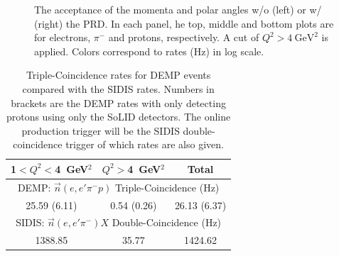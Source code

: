 \begin{figure}[!ht]
 \begin{center}
     \subfloat[w/ PRD]{
     ext=.pdf,read=.pdf,width=0.45\textwidth]{./figures/E11_acc_epi_Q2gt4}}
	 
  \caption[The acceptance of the momenta and scattering angles for electrons,
    $\pi^{-}$ and protons]{\footnotesize{The acceptance of the momenta and
    polar angles w/o (left) or w/ (right) the PRD. In each panel, he top, middle and
    bottom plots are for electrons, $\pi^{-}$ and protons, respectively. A
    cut of $Q^{2}>4~\mathrm{GeV^{2}}$ is applied. Colors correspond to rates
    (Hz) in log scale.}}
  \label{p_theta_prd}
  \end{center}
\end{figure}


\begin{table}[!ht]
\centering
\begin{tabular}{|c|c|c|}
 \hline
  1$<Q^2<$4~GeV$^2$ & $Q^2>$4~GeV$^2$ & Total\\
 \hline
\multicolumn{3}{|c|}{DEMP: $\vec{n}(e,e'\pi^{-}p)$ Triple-Coincidence (Hz)}\\
 \hline
 25.59 (6.11)   &  0.54 (0.26) & 26.13 (6.37)   \\
 \hline
\multicolumn{3}{|c|}{SIDIS: $\vec{n}(e,e'\pi^{-})X$ Double-Coincidence (Hz)}\\
 \hline
        1388.85 & 35.77        & 1424.62   \\
 \hline
\end{tabular}
\caption[Triple-Coincidence rates for
  neutron-DEMP]{\footnotesize{Triple-Coincidence rates for DEMP events compared
    with the SIDIS rates. Numbers in brackets are the DEMP rates with only
    detecting protons using only the SoLID detectors. The online production
    trigger will be the SIDIS double-coincidence trigger of which rates are
    also given.}}
\label{rate_table_prd}
\end{table} 



